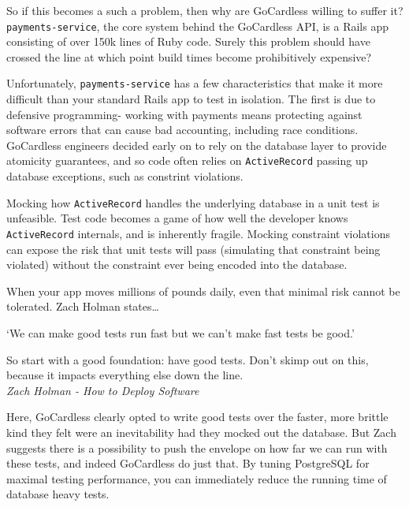 \documentclass[11pt]{article}
\begin{document}
So if this becomes a such a problem, then why are GoCardless willing to suffer it?
\texttt{payments-service}, the core system behind the GoCardless API, is a Rails app
consisting of over 150k lines of Ruby code. Surely this problem should have
crossed the line at which point build times become prohibitively expensive?

Unfortunately, \texttt{payments-service} has a few characteristics that make it
more difficult than your standard Rails app to test in isolation. The first is
due to defensive programming- working with payments means protecting against
software errors that can cause bad accounting, including race conditions.
GoCardless engineers decided early on to rely on the database layer to provide
atomicity guarantees, and so code often relies on \texttt{ActiveRecord} passing
up database exceptions, such as constrint violations.

Mocking how \texttt{ActiveRecord} handles the underlying database in a unit test
is unfeasible. Test code becomes a game of how well the developer knows
\texttt{ActiveRecord} internals, and is inherently fragile. Mocking constraint
violations can expose the risk that unit tests will pass (simulating that
constraint being violated) without the constraint ever being encoded into the
database.

When your app moves millions of pounds daily, even that minimal risk cannot be
tolerated. Zach Holman states\dots

\begin{displayquote}

  `We can make good tests run fast but we can't make fast tests be good.'

  So start with a good foundation: have good tests. Don't skimp out on this,
  because it impacts everything else down the line. \\

  \textit{Zach Holman - How to Deploy Software~\cite{howToDeploySoftware}}

\end{displayquote}

Here, GoCardless clearly opted to write good tests over the faster, more brittle
kind they felt were an inevitability had they mocked out the database. But Zach
suggests there is a possibility to push the envelope on how far we can run
with these tests, and indeed GoCardless do just that. By tuning PostgreSQL for
maximal testing performance, you can immediately reduce the running time of
database heavy tests.
\end{document}
